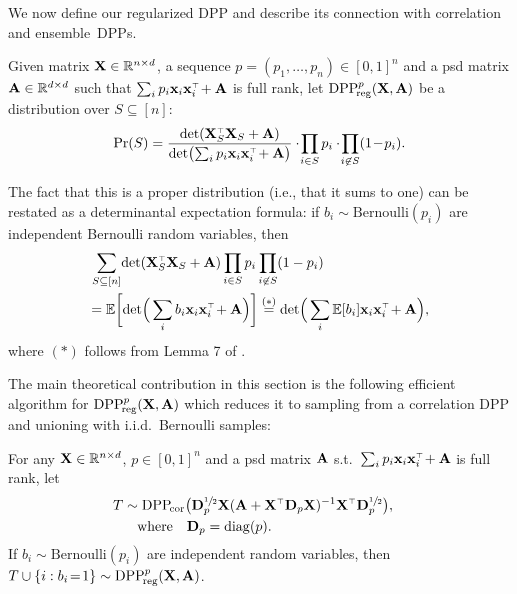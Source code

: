 \documentclass[../../thesis.tex]{subfiles}
\begin{document}
We now define our regularized DPP and describe its
connection with correlation and ensemble~DPPs.
\begin{definition}\label{d:r-dpp}
  Given matrix $\mathbf X\in\mathbb R^{n\times d}$, a sequence  $p=(p_1,\dots,p_n)\in[0,1]^n$
  and a psd matrix $\mathbf A\in\mathbb R^{d\times d}$ such that
  $\sum_ip_i\x_i\x_i^\top\!+\A$ is
  full rank, let
  ${{\mathrm{DPP}}_{\!\mathrm{reg}}^{p}}(\mathbf X,\mathbf A)$ be a distribution over $S\subseteq [n]$:
  \begin{align}
    \Pr(S) = \frac{\det(
      \X_S^\top\X_S+\A)}{\det\!\big(\!
      \sum_ip_i\x_i\x_i^\top\!+ \A\big)}
    \cdot \!\prod_{i\in S}p_{i}\cdot\!\prod_{i\not\in S}(1\!-\!p_i).\label{eq:poisson-prob}
  \end{align}
\end{definition}
The fact that this is a proper distribution (i.e., that it sums to
one) can be restated as a determinantal expectation formula: if
$b_i\sim\mathrm{Bernoulli}(p_i)$ are independent Bernoulli random
variables, then
\begin{align*}
   & \sum_{S\subseteq [n]}\!\det(
  \X_S^\top\X_S+\A)\prod_{i\in S}p_{i}\prod_{i\not\in S}(1-p_i) \\
   & \!=
  \E\bigg[\!\det\!\Big(\sum_ib_i\x_i\x_i^\top\!+\A\Big)\bigg]\overset{(*)}{=}
  \det\!\Big(\sum_i\E[b_i]\x_i\x_i^\top\!+\A\Big),
\end{align*}
where $(*)$ follows  from Lemma 7 of \citet{determinantal-averaging}.

The main theoretical contribution in this section is the
following efficient algorithm for ${{\mathrm{DPP}}_{\!\mathrm{reg}}^{p}}(\mathbf X,\mathbf A)$ which reduces it to
sampling from a correlation DPP and unioning with i.i.d.~Bernoulli samples:
\begin{theorem}\label{t:algorithm}
  For any $\mathbf X\in\mathbb R^{n\times d}$, $p\in[0,1]^n$ and a psd matrix $\mathbf A$
  s.t.~$\sum_ip_i\x_i\x_i^\top\!+\A$ is
  full rank, let
  \begin{align*}
    T & \sim\DPPcor\big(\D_p^{\sfrac12}\X(\A+\X^\top\D_p\X)^{-1}\X^\top\D_p^{\sfrac12}\big),
    \quad                                                                                    \\
      & \quad\text{where}\quad\D_p=\diag(p).
  \end{align*}
  If $b_i\sim\mathrm{Bernoulli}(p_i)$ are independent random variables, then
  $T\cup \{i:b_i\!=\!1\}\sim {{\mathrm{DPP}}_{\!\mathrm{reg}}^{p}}(\mathbf X,\mathbf A)$.
\end{theorem}
\end{document}
